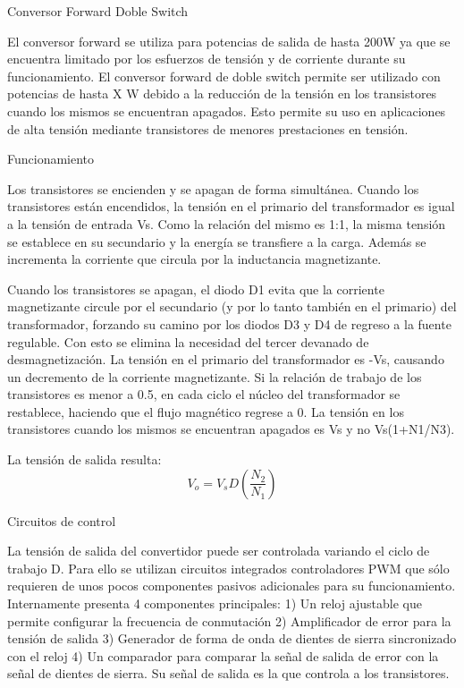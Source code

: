 Conversor Forward Doble Switch

El conversor forward se utiliza para potencias de salida de hasta 200W ya que se encuentra limitado 
por los esfuerzos de tensión y de corriente durante su funcionamiento. 
El conversor forward de doble switch permite ser utilizado con potencias de hasta X W debido a la 
reducción de la tensión en los transistores cuando los mismos se encuentran apagados. 
Esto permite su uso en aplicaciones de alta tensión mediante transistores de menores prestaciones en tensión. 

Funcionamiento 

Los transistores se encienden y se apagan de forma simultánea. 
Cuando los transistores están encendidos, la tensión en el primario del transformador es igual a la tensión de entrada Vs. 
Como la relación del mismo es 1:1, la misma tensión se establece en su secundario y la energía se transfiere a la carga. 
Además se incrementa la corriente que circula por la inductancia magnetizante. 

Cuando los transistores se apagan, el diodo D1 evita que la corriente magnetizante circule por el secundario 
(y por lo tanto también en el primario) del transformador, forzando su camino por los diodos D3 y D4 de regreso a la fuente regulable.  
Con esto se elimina la necesidad del tercer devanado de desmagnetización. 
La tensión en el primario del transformador es -Vs, causando un decremento de la corriente magnetizante. 
Si la relación de trabajo de los transistores es menor a 0.5, en cada ciclo el núcleo del transformador se restablece, 
haciendo que el flujo magnético regrese a 0. 
La tensión en los transistores cuando los mismos se encuentran apagados es Vs y no Vs(1+N1/N3).

La tensión de salida resulta:
$$ V_{o}=V_{s}D(\frac{N_{2}}{N_{1}}) $$




Circuitos de control

La tensión de salida del convertidor puede ser controlada variando el ciclo de trabajo D. 
Para ello se utilizan circuitos integrados controladores PWM que sólo requieren de unos pocos componentes pasivos adicionales para su funcionamiento. 
Internamente presenta 4 componentes principales:
1) Un reloj ajustable que permite configurar la frecuencia de conmutación 
2) Amplificador de error para la tensión de salida
3) Generador de forma de onda de dientes de sierra sincronizado con el reloj
4) Un comparador para comparar la señal de salida de error con la señal de dientes de sierra.
Su señal de salida es la que controla a los transistores. 

